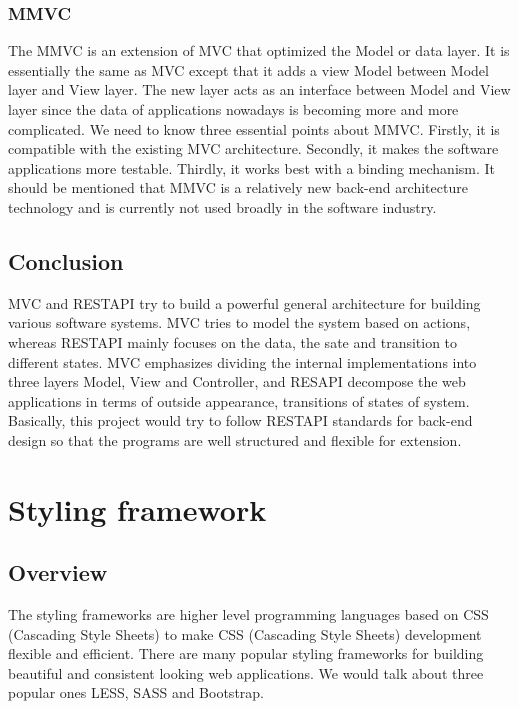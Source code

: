 \documentclass[letterpaper,10pt]{article}
\begin{document}
		\subsubsection{MMVC}
    The MMVC is an extension of MVC that optimized the Model or data layer. It is essentially the same as MVC except that it adds a view Model between Model layer and View layer. The new layer acts as an interface between Model and View layer since the data of applications nowadays is becoming more and more complicated. We need to know three essential points about MMVC. Firstly, it is compatible with the existing MVC architecture. Secondly, it makes the software applications more testable. Thirdly, it works best with a binding mechanism. It should be mentioned that MMVC is a relatively new back-end architecture technology and is currently not used broadly in the software industry.


	\subsection{Conclusion}
  		MVC and RESTAPI try to build a powerful general architecture for building various software systems. MVC tries to model the system based on actions, whereas RESTAPI mainly focuses on the data, the sate and transition to different states. MVC emphasizes dividing the internal implementations into three layers Model, View and Controller, and RESAPI decompose the web applications in terms of outside appearance, transitions of states of system. Basically, this project would try to follow RESTAPI standards for back-end design so that the programs are well structured and flexible for extension.


\section{Styling framework}
	\subsection{Overview}
  The styling frameworks are higher level programming languages based on CSS (Cascading Style Sheets) to make CSS (Cascading Style Sheets) development flexible and efficient. There are many popular styling frameworks for building beautiful and consistent looking web applications. We would talk about three popular ones LESS, SASS and Bootstrap.
\end{document}
